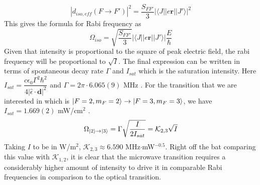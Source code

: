\documentclass[%
 reprint,
 amsmath,amssymb,
 aps,
]{revtex4-2}
\begin{document}
\begin{equation}
    |d_{iso,eff}(F\to F')|^2 = \dfrac{S_{FF'}}{3}|\langle J||e\textbf{r}||J'\rangle|^2
\end{equation}
This gives the formula for Rabi frequency as
\begin{equation}
    \Omega_{iso} = \sqrt{\dfrac{S_{FF'}}{3}}|\langle J||e\textbf{r}||J'\rangle|\dfrac{E}{\hbar}
\end{equation}
Given that intensity is proportional to the square of peak electric field, the rabi frequency will be proportional to $\sqrt{I}$. The final expression can be written in terms of spontaneous decay rate $\Gamma$ and $I_{sat}$ which is the saturation intensity. Here $I_{sat} = \dfrac{c\epsilon_0\Gamma^2\hbar^2}{4|\hat{\epsilon}\cdot\textbf{d}|^2}$ and $\Gamma = 2\pi\cdot 6.065(9)$ MHz \cite{1996PhST...65...48V}. For the transition that we are interested in which is $\ket{F=2,m_F=2}\to\ket{F=3,m_F=3}$, we have $I_{sat} = 1.669(2)$ mW/cm$^2$ \cite{rb87dline}.
\begin{equation}
    \Omega_{\ket{2}\to\ket{3}} = \Gamma\sqrt{\dfrac{I}{2I_{sat}}} = \mathcal{K}_{2,3}\sqrt{I} 
\end{equation}
Taking $I$ to be in W/m$^2$, $\mathcal{K}_{2,3} \approx 6.590$ MHz$\cdot$mW$^{-0.5}$. Right off the bat comparing this value with $\mathcal{K}_{1,2}$, it is clear that the microwave transition requires a considerably higher amount of intensity to drive it in comparable Rabi frequencies in comparison to the optical transition.
\end{document}
